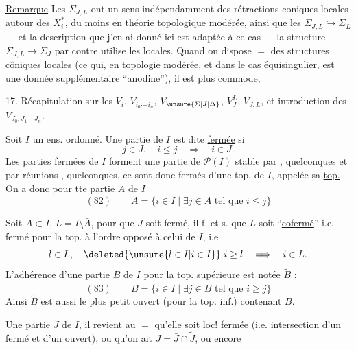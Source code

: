 \uline{Remarque} Les $\Sigma_{J,L}$ ont un sens  indépendamment des rétractions coniques locales autour des $X_i^*$, du moins en théorie topologique modérée, ainsi que les $\Sigma_{J,L}\hookrightarrow\Sigma_L$ --- et la description que j'en ai donné ici est adaptée à ce cas --- la structure $\Sigma_{J,L}\to\Sigma_J$ par contre utilise les     locales. Quand on dispose $=$ des structures côniques locales (ce qui, en topologie modérée, et dans le cas équisingulier, est une donnée supplémentaire ``anodine''), il est plus commode,


17. Récapitulation sur les $V_i$, $V_{i_0\mathord{\cdot}\mathord{-}i_n}$, $V_{\unsure{\Sigma|J|\Delta}}$, $V_J^L$, $V_{J,L}$, et introduction des $V_{J_0,J_1\mathord{\cdot}\mathord{-}J_n}$.

Soit $I$ un ens. ordonné. Une partie  de $I$ est dite \uline{fermée} si
\[j\in J,\quad i\leq j\quad\Longrightarrow\quad i\in J.\]
Les parties fermées de $I$ forment une  partie de $\mathcal P(I)$ stable par , quelconques et par réunions , quelconques, ce sont donc   fermés d'une top. de $I$, appelée sa \uline{top.}   On a donc pour tte partie $A$ de $I$
\[
(82)\qquad\bar A=\{i\in I\mid\exists j\in A\text{ tel que }i\leq j\}
\]

 Soit $A\subset I$, $L=I\setminus\bar A$, pour que $J$ soit fermé,  il f. et s. que $L$ soit ``\uline{cofermé}'' i.e. fermé pour la top.  à l'ordre opposé à  celui de $I$, i.e
\[l\in L,\quad\deleted{\unsure{l\in I|i\in I}}\ i\geq l\quad\Longrightarrow\quad i\in L.\]
L'adhérence d'une partie $B$ de $I$ pour la top. supérieure est notée $\widetilde B$ :
\[
(83)\qquad\widetilde B=\{i\in I\mid\exists j\in B\text{ tel que }i\geq j\}
\]
 Ainsi $\widetilde B$ est aussi le plus petit ouvert (pour la top. inf.) contenant $B$.

 Une partie $J$ de $I$, il revient au $=$ qu'elle soit loc! fermée (i.e. intersection d'un fermé et d'un ouvert), ou qu'on ait $J=\bar J\cap\widetilde J$, ou encore

